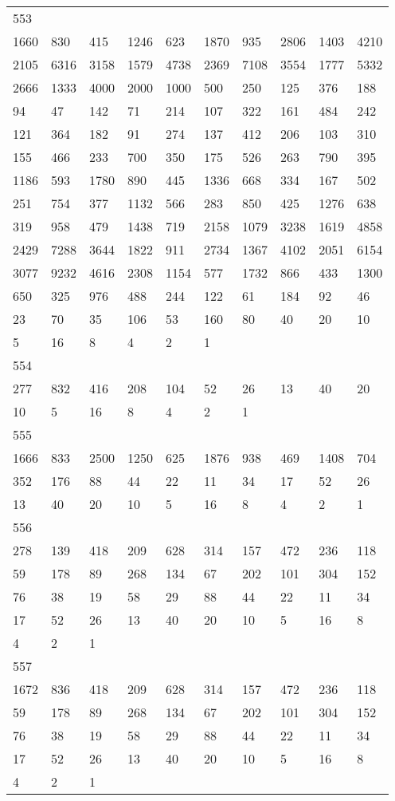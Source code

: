 \begin{longtable}{*{10}{l}}
553&&&&&&&&&\\
1660& 830& 415& 1246& 623& 1870& 935& 2806& 1403& 4210\\
2105& 6316& 3158& 1579& 4738& 2369& 7108& 3554& 1777& 5332\\
2666& 1333& 4000& 2000& 1000& 500& 250& 125& 376& 188\\
94& 47& 142& 71& 214& 107& 322& 161& 484& 242\\
121& 364& 182& 91& 274& 137& 412& 206& 103& 310\\
155& 466& 233& 700& 350& 175& 526& 263& 790& 395\\
1186& 593& 1780& 890& 445& 1336& 668& 334& 167& 502\\
251& 754& 377& 1132& 566& 283& 850& 425& 1276& 638\\
319& 958& 479& 1438& 719& 2158& 1079& 3238& 1619& 4858\\
2429& 7288& 3644& 1822& 911& 2734& 1367& 4102& 2051& 6154\\
3077& 9232& 4616& 2308& 1154& 577& 1732& 866& 433& 1300\\
650& 325& 976& 488& 244& 122& 61& 184& 92& 46\\
23& 70& 35& 106& 53& 160& 80& 40& 20& 10\\
5& 16& 8& 4& 2& 1& \\

554&&&&&&&&&\\
277& 832& 416& 208& 104& 52& 26& 13& 40& 20\\
10& 5& 16& 8& 4& 2& 1& \\

555&&&&&&&&&\\
1666& 833& 2500& 1250& 625& 1876& 938& 469& 1408& 704\\
352& 176& 88& 44& 22& 11& 34& 17& 52& 26\\
13& 40& 20& 10& 5& 16& 8& 4& 2& 1\\

556&&&&&&&&&\\
278& 139& 418& 209& 628& 314& 157& 472& 236& 118\\
59& 178& 89& 268& 134& 67& 202& 101& 304& 152\\
76& 38& 19& 58& 29& 88& 44& 22& 11& 34\\
17& 52& 26& 13& 40& 20& 10& 5& 16& 8\\
4& 2& 1& \\

557&&&&&&&&&\\
1672& 836& 418& 209& 628& 314& 157& 472& 236& 118\\
59& 178& 89& 268& 134& 67& 202& 101& 304& 152\\
76& 38& 19& 58& 29& 88& 44& 22& 11& 34\\
17& 52& 26& 13& 40& 20& 10& 5& 16& 8\\
4& 2& 1& \\


\end{longtable}
